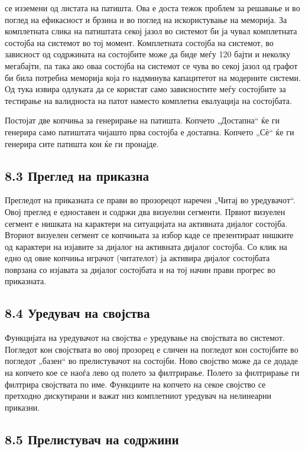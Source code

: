 се изземени од листата на патишта. Ова е доста тежок проблем за решавање и во поглед на ефикасност и брзина и во поглед на искористување на меморија. За комплетната слика на патиштата секој јазол во системот би ја чувал комплетната состојба на системот во тој момент. Комплетната состојба на системот, во зависност од содржината на состојбите може да биде меѓу 120 бајти и неколку мегабајти, па така ако оваа состојба на системот се чува во секој јазол од графот би била потребна меморија која го надминува капацитетот на модерните системи. Од тука извира одлуката да се користат само зависностите меѓу состојбите за тестирање на валидноста на патот наместо комплетна евалуација на состојбата.

Постојат две копчиња за генерирање на патишта. Копчето „Достапна“ ќе ги генерира само патиштата чијашто прва состојба е достапна. Копчето „Сѐ“ ќе ги генерира сите патишта кои ќе ги пронајде.

\subsection{8.3 Преглед на приказна}

Прегледот на приказната се прави во прозорецот наречен „Читај во уредувачот“. Овој преглед е едноставен и содржи два визуелни сегменти. Првиот визуелен сегмент е нишката на карактери на ситуацијата на активната дијалог состојба. Вториот визуелен сегмент се копчињата за избор каде се презентираат нишките од карактери на изјавите за дијалог на активната дијалог состојба. Со клик на едно од овие копчиња играчот (читателот) ја активира дијалог состојбата поврзана со изјавата за дијалог состојбата и на тој начин прави прогрес во приказната.


\subsection{8.4 Уредувач на својства}

Функцијата на уредувачот на својства e уредување на својствата во системот. Погледот кон својствата во овој прозорец е сличен на погледот кон состојбите во погледот „базен“ во прелистувачот на состојби. Ново својство може да се додаде на копчето кое се наоѓа лево од полето за филтрирање. Полето за филтрирање ги филтрира својствата по име. Функциите на копчето на секое својство се претходно дискутирани и важат низ комплетниот уредувач на нелинеарни приказни.


\subsection{8.5 Прелистувач на содржини}

